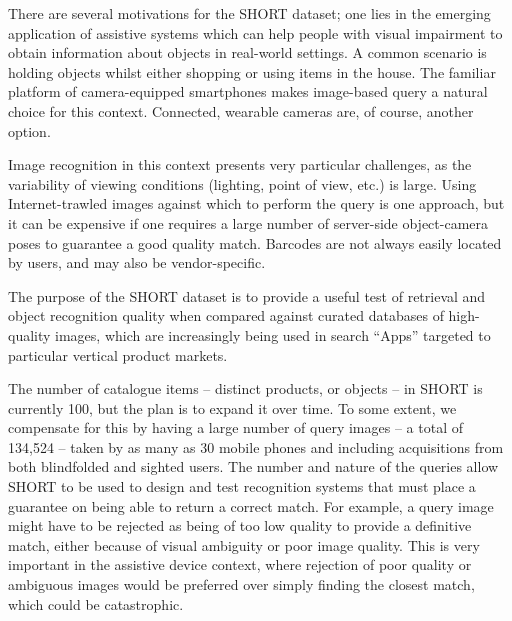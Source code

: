 There are several motivations for the SHORT dataset; one lies in the emerging application of assistive systems which can help people with visual impairment to obtain information about objects in real-world settings. A common scenario is holding objects whilst either shopping or using items in the house. The familiar platform of camera-equipped smartphones makes image-based query a natural choice for this context. Connected, wearable cameras are, of course, another option.

Image recognition in this context presents very particular challenges, as the variability of viewing conditions (lighting, point of view, etc.) is large. Using Internet-trawled images against which to perform the query is one approach, but it can be expensive if one requires a large number of server-side object-camera poses to guarantee a good quality match. Barcodes are not always easily located by users, and may also be vendor-specific. 


The purpose of the SHORT dataset is to provide a useful test of retrieval and object recognition quality when compared against curated databases of high-quality images, which are increasingly being used in search ``Apps'' targeted to particular vertical product markets. 



The number of catalogue items -- distinct products, or objects -- in SHORT is currently 100, but the plan is to expand it over time. To some extent, we compensate for this by having a large number of query images -- a total of 134,524 -- taken by as many as 30 mobile phones and including acquisitions from both blindfolded and sighted users. The number and nature of the queries allow SHORT to be used to design and test recognition systems that must place a guarantee on being able to return a correct match. For example, a query image might have to be rejected as being of too low quality to provide a definitive match, either because of visual ambiguity or poor image quality. This is very important in the assistive device context, where rejection of poor quality or ambiguous images would be preferred over simply finding the closest match, which could be catastrophic.

